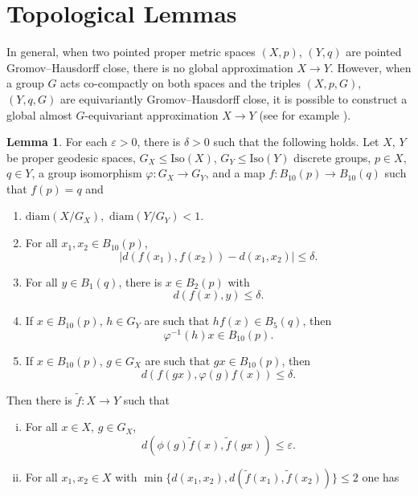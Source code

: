 \documentclass[12pt]{amsart}
\theoremstyle{definition}
\def\fnum{equation}
\newtheorem{lemma}[\fnum]{Lemma}
\numberwithin{equation}{section}
\newcommand{\diam}{{\text {diam}}}
\newcommand{\iso}{\text{Iso}}
\begin{document}
\section{Topological Lemmas}\label{sec:topology}

In general, when two pointed proper metric spaces $(X,p)$, $(Y,q)$ are pointed Gromov--Hausdorff close, there is no global approximation $X \to Y$. However, when a group $G$ acts co-compactly on both spaces and the triples $(X,p,G)$, $(Y,q,G)$ are equivariantly Gromov--Hausdorff close, it is possible to construct a global almost $G$-equivariant approximation $X \to Y$ (see for example \cite[Theorem 4.1]{wang-limit}). 

\begin{lemma}\label{lem:local-to-global-approximation}
For each $\varepsilon > 0 $, there is $\delta > 0 $ such that the following holds. Let $X$, $Y$ be proper geodesic spaces, $G_{X} \leq \iso (X)$, $G_Y \leq \iso (Y) $ discrete groups, $p \in X$, $q \in Y$, a group isomorphism $\varphi : G_X \to G_Y$, and a map $f : B_{10}(p) \to B_{10}(q)$ such that $f(p) = q$ and
\begin{enumerate}[1.]
    \item $\diam ( X / G_X ),$ $\diam (Y / G_Y )  < 1$. \label{condition:f-1}
    \item  For all $x_1, x_2 \in B_{10}(p)$,  
    \[   \vert d(f(x_1), f(x_2)) - d(x_1, x_2) \vert \leq \delta .                 \]\label{condition:f-2}
    \item  For all $y \in B_1(q)$, there is $x \in B_2 (p)$ with
    \[     d(f(x) ,y) \leq \delta .        
    \]\label{condition:f-2.5}
    \item \color{black} If $x \in B_{10}(p)$, $h \in G_Y$ are such that $hf(x) \in B_{5}(q)$, then 
    \[   \varphi^{-1}(h) x \in B_{10}(p).    \] \label{condition:f-3}
    \item  If $x \in B_{10}(p)$, $g \in G_X$ are such that $gx \in B_{10}(p)$, then 
    \[   d(f(gx), \varphi (g) f(x) ) \leq \delta .    \]\label{condition:f-4}
\end{enumerate}
 Then there is $\tilde {f} : X \to Y$ such that
 \begin{enumerate}[i.]
     \item     For all $x \in X$, $g \in G_X$, 
     \[         d(  \phi (g)  \tilde{f} (x)  , \tilde{f} (gx) ) \leq \varepsilon .                  \]\label{conclusion:f-tilde-eq}     
     \item For all $x_1, x_2 \in X$ with $\min \{ d(x_1, x_2) ,  d(\tilde{f} (x_1),\tilde{f} (x_2)) \}  \leq 2 $  one has 

\end{enumerate}
\end{lemma}
\end{document}
